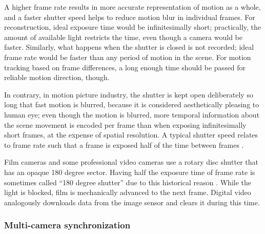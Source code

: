 A higher frame rate results in more accurate representation of motion as a whole, and a faster shutter speed helps to reduce motion blur in individual frames.
For reconstruction, ideal exposure time would be infinitesimally short; practically, the amount of available light restricts the time, even though a camera would be faster.
Similarly, what happens when the shutter is closed is not recorded; ideal frame rate would be faster than any period of motion in the scene.
For motion tracking based on frame differences, a long enough time should be passed for reliable motion direction, though.

In contrary, in motion picture industry, the shutter is kept open deliberately so long that fast motion is blurred, because it is considered aesthetically pleasing to human eye;
even though the motion is blurred, more temporal information about the scene movement is encoded per frame than when exposing infinitesimally short frames, at the expense of spatial resolution.
A typical shutter speed relates to frame rate such that a frame is exposed half of the time between frames \cite{wilson2004anton}.

Film cameras and some professional video cameras use a rotary disc shutter that has an opaque 180 degree sector.
Having half the exposure time of frame rate is sometimes called ``180 degree shutter'' due to this historical reason \cite{wilson2004anton}.
While the light is blocked, film is mechanically advanced to the next frame.
Digital video analogously downloads data from the image sensor and clears it during this time.



\subsubsection{Multi-camera synchronization} %


